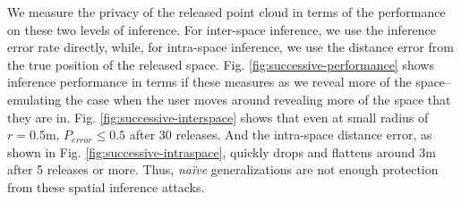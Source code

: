 We measure the privacy of the released point cloud in terms of the performance on these two levels of inference. For inter-space inference, we use the inference error rate directly, while, for intra-space inference, we use the distance error from the true position of the released space. Fig. \ref{fig:successive-performance} shows inference performance in terms if these measures as we reveal more of the space--emulating the case when the user moves around revealing more of the space that they are in. Fig. \ref{fig:successive-interspace} shows that even at small radius of $r = 0.5$m, $P_{error}\leq0.5$ after 30 releases. And the intra-space distance error, as shown in Fig. \ref{fig:successive-intraspace}, quickly drops and flattens around $3$m after 5 releases or more. Thus, \textit{na\"ive} generalizations are not enough protection from these spatial inference attacks.


